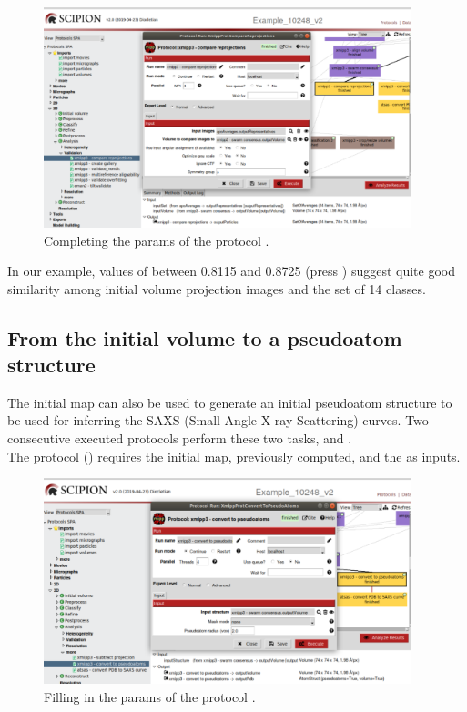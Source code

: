 \begin{figure}[H]
  \centering
  \captionsetup{width=.8\linewidth} 
  \includegraphics[width=0.95\textwidth]
  {images/xmipp_compare_reprojections.pdf}
  \caption{Completing the params of the protocol .}
  \label{fig:xmipp_compare_reprojections}
  \end{figure}
  
In our example, values of  between 0.8115 and 0.8725 (press ) suggest quite good similarity among initial volume projection images and the set of 14  classes.\\

\subsection*{From the initial volume to a pseudoatom structure}
The initial map can also be used to generate an initial pseudoatom structure to be used for inferring the SAXS (Small-Angle X-ray Scattering) curves. Two consecutive executed protocols perform these two tasks,  and .\\

The protocol  () requires the initial map, previously computed, and the  as inputs.

\begin{figure}[H]
  \centering
  \captionsetup{width=.8\linewidth} 
  \includegraphics[width=0.95\textwidth]
  {images/xmipp_convert_to_pseudoatoms.pdf}
  \caption{Filling in the params of the protocol .}
  \label{fig:xmipp_convert_to_pseudoatoms}
  \end{figure}

